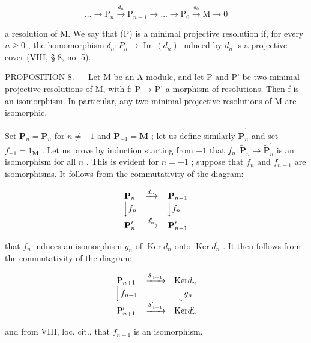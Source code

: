 \[
\dots \longrightarrow \mathrm{P} _ {n} \xrightarrow {d _ {n}} \mathrm{P} _ {n - 1} \longrightarrow \dots \longrightarrow \mathrm{P} _ {0} \xrightarrow {d _ {0}} \mathrm{M} \longrightarrow 0\tag{P}
\]

a resolution of M. We say that (P) is a minimal projective resolution if, for every \(n \geqslant 0\) , the homomorphism \(\delta_{n}: P_{n} \to \operatorname{Im}(d_{n})\) induced by \(d_{n}\) is a projective cover (VIII, § 8, no. 5).

PROPOSITION 8. — Let M be an A-module, and let P and P' be two minimal projective resolutions of M, with f: P → P' a morphism of resolutions. Then f is an isomorphism. In particular, any two minimal projective resolutions of M are isomorphic.

Set \(\tilde{\mathbf{P}}_{n} = \mathbf{P}_{n}\) for \(n \neq -1\) and \(\tilde{\mathbf{P}}_{-1} = \mathbf{M}\) ; let us define similarly \(\tilde{\mathbf{P}}_{n}^{\prime}\) and set \(f_{-1} = 1_{\mathbf{M}}\) . Let us prove by induction starting from \(-1\) that \(f_{n}: \tilde{\mathbf{P}}_{n} \to \tilde{\mathbf{P}}_{n}^{\prime}\) is an isomorphism for all \(n\) . This is evident for \(n = -1\) ; suppose that \(f_{n}\) and \(f_{n-1}\) are isomorphisms. It follows from the commutativity of the diagram:

\[
\begin{array}{c c c} \mathbf {P} _ {n} & \xrightarrow {d _ {n}} & \mathbf {P} _ {n - 1} \\ \Big \downarrow f _ {n} & & \Big \downarrow f _ {n - 1} \\ \mathbf {P} _ {n} ^ {\prime} & \xrightarrow {d _ {n} ^ {\prime}} & \mathbf {P} _ {n - 1} ^ {\prime} \end{array}
\]

that \(f_{n}\) induces an isomorphism \(g_{n}\) of \(\operatorname{Ker} d_{n}\) onto \(\operatorname{Ker} d_{n}^{\prime}\) . It then follows from the commutativity of the diagram:

\[
\begin{array}{c c c} \mathrm{P} _ {n + 1} & \xrightarrow {\delta_ {n + 1}} & \text {Ker} d _ {n} \\ \Big \downarrow f _ {n + 1} & & \Big \downarrow g _ {n} \\ \mathrm{P} _ {n + 1} ^ {\prime} & \xrightarrow {\delta_ {n + 1} ^ {\prime}} & \text {Ker} d _ {n} ^ {\prime} \end{array}
\]

and from VIII, loc. cit., that \(f_{n+1}\) is an isomorphism.

